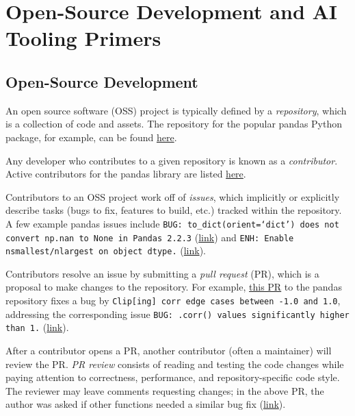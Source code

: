 \documentclass{article}
\newcommand{\inlinecode}[1]{\colorbox{codegray}{\texttt{#1}}}
\begin{document}
\section{Open-Source Development and AI Tooling Primers}
\label{sec:Primer on Open Source Development}

\subsection{Open-Source Development}

An open source software (OSS) project is typically defined by a \textit{repository}, which is a collection of code and assets. The repository for the popular pandas Python package, for example, can be found \href{https://github.com/pandas-dev/pandas}{here}. 

Any developer who contributes to a given repository is known as a \textit{contributor}. Active contributors for the pandas library are listed \href{https://pandas.pydata.org/about/team.html}{here}.

Contributors to an OSS project work off of \textit{issues}, which implicitly or explicitly describe tasks (bugs to fix, features to build, etc.) tracked within the repository. A few example pandas issues include \inlinecode{BUG: to\_dict(orient=`dict') does not convert np.nan to None in Pandas 2.2.3} (\href{https://github.com/pandas-dev/pandas/issues/61323}{link}) and \inlinecode{ENH: Enable nsmallest/nlargest on object dtype.} (\href{https://github.com/pandas-dev/pandas/issues/61166}{link}).

Contributors resolve an issue by submitting a \textit{pull request} (PR), which is a proposal to make changes to the repository. For example, \href{https://github.com/pandas-dev/pandas/pull/61154}{this PR} to the pandas repository fixes a bug by \inlinecode{Clip[ing] corr edge cases between -1.0 and 1.0}, addressing the corresponding issue \inlinecode{BUG: .corr() values significantly higher than 1.} (\href{https://github.com/pandas-dev/pandas/issues/61120}{link}).

After a contributor opens a PR, another contributor (often a maintainer) will review the PR. \textit{PR review} consists of reading and testing the code changes while paying attention to correctness, performance, and repository-specific code style. The reviewer may leave comments requesting changes; in the above PR, the author was asked if other functions needed a similar bug fix (\href{https://github.com/pandas-dev/pandas/pull/61154#pullrequestreview-2706439865}{link}).
\end{document}
